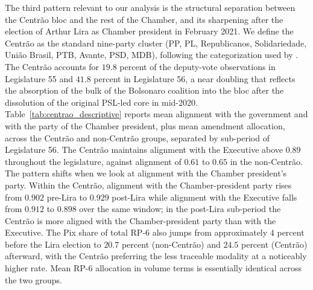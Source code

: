 \documentclass[preprint,12pt,authoryear]{elsarticle}
\begin{document}
The third pattern relevant to our analysis is the structural separation between the Centr\~ao bloc and the rest of the Chamber, and its sharpening after the election of Arthur Lira as Chamber president in February 2021. We define the Centr\~ao as the standard nine-party cluster (PP, PL, Republicanos, Solidariedade, Uni\~ao Brasil, PTB, Avante, PSD, MDB), following the categorization used by \citet{Power2010}. The Centr\~ao accounts for $19.8$ percent of the deputy-vote observations in Legislature 55 and $41.8$ percent in Legislature 56, a near doubling that reflects the absorption of the bulk of the Bolsonaro coalition into the bloc after the dissolution of the original PSL-led core in mid-2020. Table~\ref{tab:centrao_descriptive} reports mean alignment with the government and with the party of the Chamber president, plus mean amendment allocation, across the Centr\~ao and non-Centr\~ao groups, separated by sub-period of Legislature 56. The Centr\~ao maintains alignment with the Executive above $0.89$ throughout the legislature, against alignment of $0.61$ to $0.65$ in the non-Centr\~ao. The pattern shifts when we look at alignment with the Chamber president's party. Within the Centr\~ao, alignment with the Chamber-president party rises from $0.902$ pre-Lira to $0.929$ post-Lira while alignment with the Executive falls from $0.912$ to $0.898$ over the same window; in the post-Lira sub-period the Centr\~ao is more aligned with the Chamber-president party than with the Executive. The Pix share of total RP-6 also jumps from approximately $4$ percent before the Lira election to $20.7$ percent (non-Centr\~ao) and $24.5$ percent (Centr\~ao) afterward, with the Centr\~ao preferring the less traceable modality at a noticeably higher rate. Mean RP-6 allocation in volume terms is essentially identical across the two groups.
\end{document}
